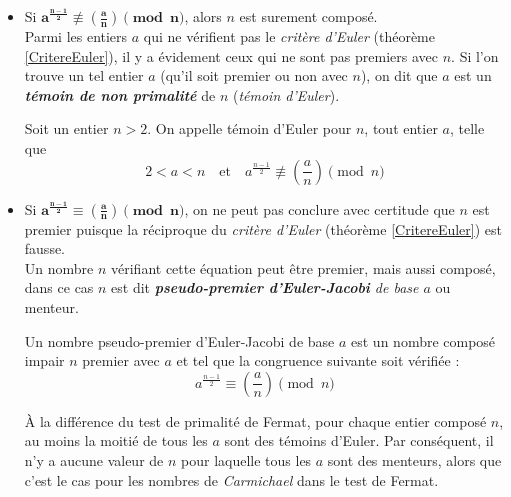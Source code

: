 		\begin{itemize}
		\item Si $\mathbf{a^{\frac{n-1}{2}} \not\equiv \left ( \frac{a}{n} \right ) \pmod n}$, alors $n$ est surement composé.\\
		Parmi les entiers $a$ qui ne vérifient pas le \textit{critère d'Euler} (théorème \ref{CritereEuler}), il y a évidement ceux qui ne sont pas premiers avec $n$. Si l'on trouve un tel entier $a$ (qu'il soit premier ou non avec $n$), on dit que $a$ est un \textit{\textbf{témoin de non primalité}} de $n$ (\textit{témoin d'Euler}).
			
			\vspace{-1.5em}\begin{adjustwidth}{1.5cm}{1.5cm} 
			\begin{Def}
			\label{TemEuler}
				Soit un entier $n > 2$. On appelle témoin d'Euler pour $n$, tout entier $a$, telle que
				\[2 < a < n  \quad \text{et} \quad a^{\frac{n-1}{2}} \not\equiv \left ( \frac{a}{n} \right ) \pmod n\]
			\end{Def}
			\end{adjustwidth}\vspace{0.5em}
		
		\item Si $\mathbf{a^{\frac{n-1}{2}} \equiv \left ( \frac{a}{n} \right ) \pmod n}$, on ne peut pas conclure avec certitude que $n$ est premier puisque la réciproque du \textit{critère d'Euler} (théorème \ref{CritereEuler}) est fausse.\\
		Un nombre $n$ vérifiant cette équation peut être premier, mais aussi composé, dans ce cas $n$ est dit \textit{\textbf{pseudo-premier d'Euler-Jacobi} de base $a$} ou menteur.
					
			\vspace{-1.5em}\begin{adjustwidth}{1.5cm}{1.5cm} 
			\begin{Def}
				\label{PseudoPremEulerJ}
				Un nombre pseudo-premier d'Euler-Jacobi de base $a$ est un nombre composé impair $n$ premier avec $a$ et tel que la congruence suivante soit vérifiée :
				\[a^{\frac{n-1}{2}} \equiv \left ( \frac{a}{n} \right ) \pmod n\]
			\end{Def}
			\end{adjustwidth}\vspace{0.5em}
			
		\indent À la différence du test de primalité de Fermat, pour chaque entier composé $n$, au moins la moitié de tous les $a$ sont des témoins d’Euler. Par conséquent, il n’y a aucune valeur de $n$ pour laquelle tous les $a$ sont des menteurs, alors que c'est le cas pour les nombres de \textit{Carmichael} dans le test de Fermat.
		\end{itemize}
	

